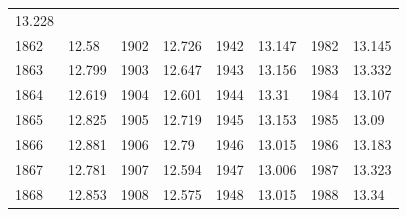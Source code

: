 \begin{description}[noitemsep]
\begin{description}[noitemsep]
\begin{table}[H]
\begin{center}
\begin{xtabular}[t]{|l|l|l|l|l|l|l|l|}
        	13.228	%
     \tabularnewline{}
        	1862	 &
        	12.58	 &
        	1902	 &
        	12.726	 &
        	1942	 &
        	13.147	 &
        	1982	 &
        	13.145	%
     \tabularnewline{}
        	1863	 &
        	12.799	 &
        	1903	 &
        	12.647	 &
        	1943	 &
        	13.156	 &
        	1983	 &
        	13.332	%
     \tabularnewline{}
        	1864	 &
        	12.619	 &
        	1904	 &
        	12.601	 &
        	1944	 &
        	13.31	 &
        	1984	 &
        	13.107	%
     \tabularnewline{}
        	1865	 &
        	12.825	 &
        	1905	 &
        	12.719	 &
        	1945	 &
        	13.153	 &
        	1985	 &
        	13.09	%
     \tabularnewline{}
        	1866	 &
        	12.881	 &
        	1906	 &
        	12.79	 &
        	1946	 &
        	13.015	 &
        	1986	 &
        	13.183	%
     \tabularnewline{}
        	1867	 &
        	12.781	 &
        	1907	 &
        	12.594	 &
        	1947	 &
        	13.006	 &
        	1987	 &
        	13.323	%
     \tabularnewline{}
        	1868	 &
        	12.853	 &
        	1908	 &
        	12.575	 &
        	1948	 &
        	13.015	 &
        	1988	 &
        	13.34	%
     \tabularnewline{}

\end{xtabular}
\end{center}
\end{table}
\end{description}
\end{description}
